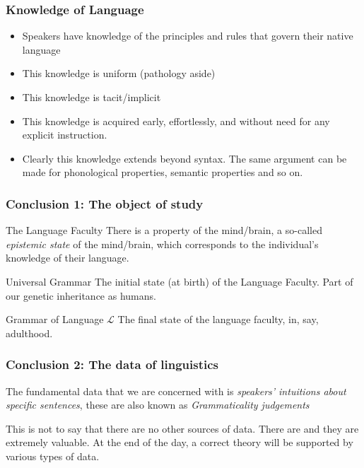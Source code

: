 \begin{frame}
\frametitle{Knowledge of Language}

\begin{itemize}
\item Speakers have knowledge of the principles and rules that govern their native language \pause
\item This knowledge is uniform (pathology aside) \pause
\item  This knowledge is tacit/implicit \pause
\item This knowledge is acquired early, effortlessly, and without need for any explicit instruction. \pause
\item Clearly this knowledge extends beyond syntax.  The same argument can be made for phonological properties, semantic properties and so on.
\end{itemize}
\end{frame}

\begin{frame}
  \frametitle{Conclusion 1: The object of study}

  \begin{block}
    {The Language Faculty}
There is a property of the mind/brain, a so-called \textit{epistemic state} of the mind/brain, which corresponds to the individual's knowledge of their language. 
  \end{block}
\pause
  \begin{block}
    {Universal Grammar}
The initial state (at birth) of the Language Faculty. Part of our genetic inheritance as humans.
  \end{block}
\pause
  \begin{block}
    {Grammar of Language $\mathcal{L}$}
The final state of the language faculty, in, say, adulthood.
  \end{block}

\end{frame}

\begin{frame}
\frametitle{Conclusion 2: The data of linguistics}

The fundamental data that we are concerned with is \textit{speakers' intuitions about specific sentences}, these are also known as \textit{Grammaticality judgements} \pause

This is not to say that there are no other sources of data.  There are and they are extremely valuable.  At the end of the day, a correct theory will be supported by various types of data.  

\end{frame}


